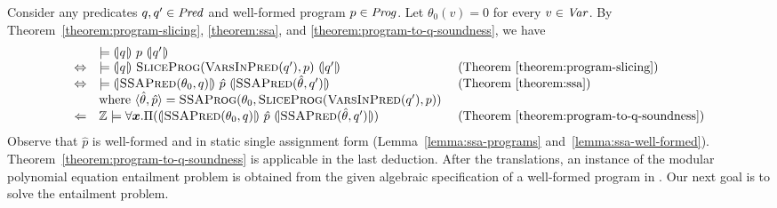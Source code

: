 
Consider any predicates $q, q' \in \mathit{Pred}$ and well-formed program $p \in
\mathit{Prog}$. Let $\theta_0 (v) = 0$ for every $v \in \mathit{Var}$. By
Theorem~\ref{theorem:program-slicing}, \ref{theorem:ssa}, and
\ref{theorem:program-to-q-soundness}, we have
\begin{equation*}
  \begin{array}{cll}
    & \models \hoaretriple{q}{p}{q'}\\
    \Leftrightarrow
    & \models 
      \hoaretriple{q}{\textsc{SliceProg}(\textsc{VarsInPred}(q'), p)}{q'}
    & \textmd{ (Theorem~\ref{theorem:program-slicing})}\\
    \Leftrightarrow
    & \models
      \hoaretriple{\textsc{SSAPred}(\theta_0, q)}
      {\hat{p}}
      {\textsc{SSAPred}(\hat{\theta}, q')}
    & \textmd{ (Theorem~\ref{theorem:ssa})}\\
    &
      \textmd{where } \langle \hat{\theta}, \hat{p} \rangle = 
      \textsc{SSAProg} (\theta_0, \textsc{SliceProg}
      (\textsc{VarsInPred}(q'), p))\\
    \Leftarrow
    & \bbfZ \models \forall \vx.
      \Pi (\hoaretriple{\textsc{SSAPred}(\theta_0, q)} {\hat{p}}
      {\textsc{SSAPred}(\hat{\theta}, q')})
    & \textmd{ (Theorem~\ref{theorem:program-to-q-soundness})}
  \end{array}
\end{equation*}
Observe that $\hat{p}$ is well-formed and in static single assignment
form (Lemma~\ref{lemma:ssa-programs} and~\ref{lemma:ssa-well-formed}).
Theorem~\ref{theorem:program-to-q-soundness} is applicable in the last
deduction. After the translations, an instance of the modular
polynomial equation entailment problem is obtained from the given
algebraic specification of a well-formed program in \mydsl. Our next
goal is to solve the entailment problem.